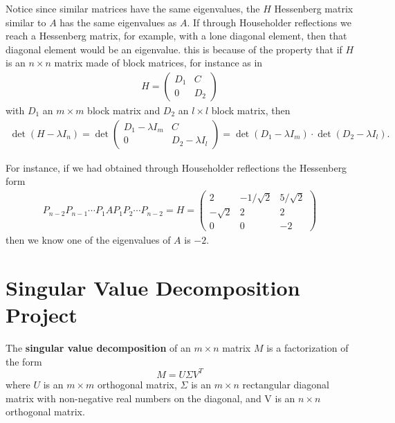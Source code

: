 \documentclass[11.5pt]{article}
\theoremstyle{definition}
\begin{document}
Notice since similar matrices have the same eigenvalues, the $H$ Hessenberg matrix similar to $A$ has the same eigenvalues as $A$. If through Householder reflections we reach a Hessenberg matrix, for example, with a lone diagonal element, then that diagonal element would be an eigenvalue. this is because of the property that if $H$ is an $n\times n$ matrix made of block matrices, for instance as in
\begin{align*}
H=\begin{pmatrix}
D_1 & C \\ 
0 & D_2
\end{pmatrix}
\end{align*} with $D_1$ an $m\times m$ block matrix and $D_2$ an $l\times l$ block matrix, then
\begin{align*}
\det (H-\lambda I_n) =
\det \begin{pmatrix}
D_1-\lambda I_m & C \\ 
0 & D_2-\lambda I_l
\end{pmatrix}=
\det (D_1-\lambda I_m)\cdot\det (D_2-\lambda I_l).
\end{align*}

 For instance, if we had obtained through Householder reflections the Hessenberg form
\begin{align*}
P_{n-2}P_{n-1}\cdots P_{1}A P_{1}P_2\cdots P_{n-2}=H=
\begin{pmatrix}
2 & -1/\sqrt{2} & 5/\sqrt{2} \\ 
-\sqrt{2} & 2 & 2 \\ 
0 & 0 & -2
\end{pmatrix} 
\end{align*}
then we know one of the eigenvalues of $A$ is $-2$. 





\section{Singular Value Decomposition Project}

The \textbf{singular value decomposition} of an $m\times n$ matrix $M$ is a factorization of the form 
$$
M = U\Sigma V^{T}
$$
where $U$ is an $m\times m$ orthogonal matrix, $\Sigma$ is an $m\times n$ rectangular diagonal matrix with non-negative real numbers on the diagonal, and V is an $n\times n$ orthogonal matrix. 
\end{document}
